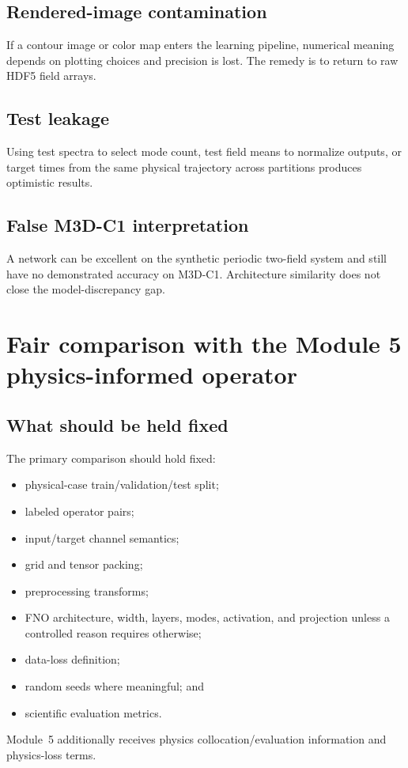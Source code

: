 \documentclass[11pt]{article}
\begin{document}
\subsection{Rendered-image contamination}
If a contour image or color map enters the learning pipeline, numerical meaning depends on plotting choices and precision is lost. The remedy is to return to raw HDF5 field arrays.

\subsection{Test leakage}
Using test spectra to select mode count, test field means to normalize outputs, or target times from the same physical trajectory across partitions produces optimistic results.

\subsection{False M3D-C1 interpretation}
A network can be excellent on the synthetic periodic two-field system and still have no demonstrated accuracy on M3D-C1. Architecture similarity does not close the model-discrepancy gap.

\section{Fair comparison with the Module 5 physics-informed operator}
\label{sec:fairness}

\subsection{What should be held fixed}
The primary comparison should hold fixed:
\begin{itemize}
  \item physical-case train/validation/test split;
  \item labeled operator pairs;
  \item input/target channel semantics;
  \item grid and tensor packing;
  \item preprocessing transforms;
  \item FNO architecture, width, layers, modes, activation, and projection unless a controlled reason requires otherwise;
  \item data-loss definition;
  \item random seeds where meaningful; and
  \item scientific evaluation metrics.
\end{itemize}
Module~5 additionally receives physics collocation/evaluation information and physics-loss terms.
\end{document}
